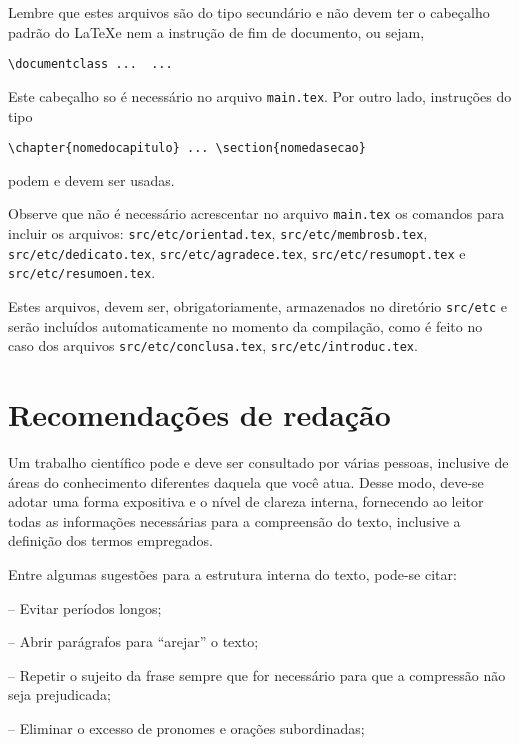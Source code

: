 Lembre que estes arquivos são do tipo secundário e não devem ter o cabeçalho padrão do \LaTeX  e nem a instrução de fim de documento, ou sejam,
\begin{verbatim}
\documentclass ...  ... 
\end{verbatim}

Este cabeçalho so é necessário no arquivo \texttt{main.tex}. Por outro
lado, instruções do tipo
\begin{verbatim}
\chapter{nomedocapitulo} ... \section{nomedasecao}
\end{verbatim}
podem e devem ser usadas.

Observe que não é necessário acrescentar no arquivo \texttt{main.tex}
os comandos para incluir os arquivos: \texttt{src/etc/orientad.tex}, \texttt{src/etc/membrosb.tex},
\texttt{src/etc/dedicato.tex}, \texttt{src/etc/agradece.tex}, \texttt{src/etc/resumopt.tex} e \texttt{src/etc/resumoen.tex}.

Estes arquivos, devem ser, obrigatoriamente, armazenados no diretório \texttt{src/etc} e serão incluídos automaticamente no momento da compilação, como é feito no caso dos arquivos \texttt{src/etc/conclusa.tex}, \texttt{src/etc/introduc.tex}.

\section{Recomendações de redação}
Um trabalho científico pode e deve ser consultado por várias pessoas, inclusive de áreas do conhecimento diferentes daquela que você atua. Desse modo, deve-se adotar uma forma expositiva e o nível de clareza interna, fornecendo ao leitor todas as informações necessárias para a compreensão do texto, inclusive a definição dos termos empregados.

Entre algumas sugestões para a estrutura interna do texto, pode-se citar:

– Evitar períodos longos;

– Abrir parágrafos para “arejar” o texto;

– Repetir o sujeito da frase sempre que for necessário para que a compressão não seja prejudicada;

– Eliminar o excesso de pronomes e orações subordinadas;

